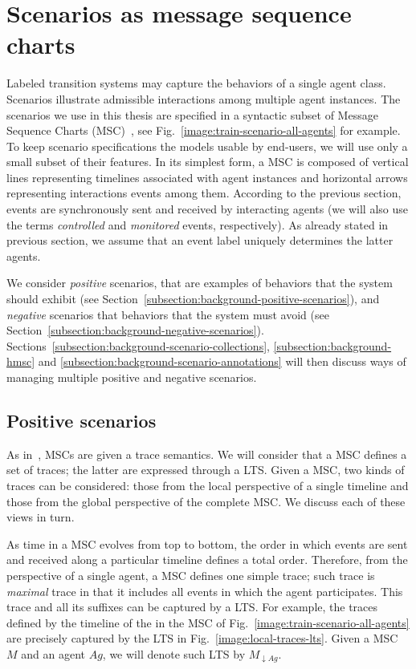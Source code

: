 \section{Scenarios as message sequence charts\label{section:background-scenarios}}

Labeled transition systems may capture the behaviors of a single agent class. Scenarios illustrate admissible interactions among multiple agent instances. The scenarios we use in this thesis are specified in a syntactic subset of Message Sequence Charts (MSC)~\cite{ITU:1996}, see Fig.~\ref{image:train-scenario-all-agents} for example. To keep scenario specifications the models usable by end-users, we will use only a small subset of their features. In its simplest form, a MSC is composed of vertical lines representing timelines associated with agent instances and horizontal arrows representing interactions events among them. According to the previous section, events are synchronously sent and received by interacting agents (we will also use the terms \emph{controlled} and \emph{monitored} events, respectively). As already stated in previous section, we assume that an event label uniquely determines the latter agents. 

We consider \emph{positive} scenarios, that are examples of behaviors that the system should exhibit (see Section~\ref{subsection:background-positive-scenarios}), and \emph{negative} scenarios that behaviors that the system must avoid (see Section~\ref{subsection:background-negative-scenarios}). Sections~\ref{subsection:background-scenario-collections}, \ref{subsection:background-hmsc} and \ref{subsection:background-scenario-annotations} will then discuss ways of managing multiple positive and negative scenarios. 

\subsection{Positive scenarios\label{subsection:background-positive-scenarios}}

As in~\cite{Uchitel:2004}, MSCs are given a trace semantics. We will consider that a MSC defines a set of traces; the latter are expressed through a LTS. Given a MSC, two kinds of traces can be considered: those from the local perspective of a single timeline and those from the global perspective of the complete MSC. We discuss each of these views in turn.

As time in a MSC evolves from top to bottom, the order in which events are sent and received along a particular timeline defines a total order. Therefore, from the perspective of a single agent, a MSC defines one simple trace; such trace is \emph{maximal} trace in that it includes all events in which the agent participates. This trace and all its suffixes can be captured by a LTS. For example, the traces defined by the timeline of the  in the MSC of Fig.~\ref{image:train-scenario-all-agents} are precisely captured by the LTS in Fig.~\ref{image:local-traces-lts}. Given a MSC $M$ and an agent $Ag$, we will denote such LTS by $M_{\downarrow Ag}$.

